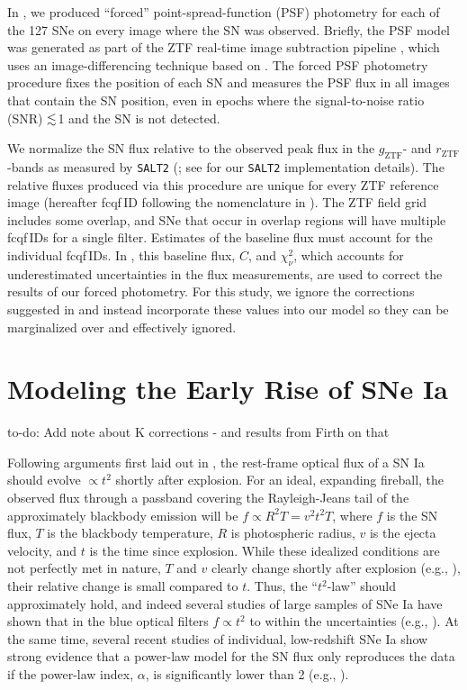 \documentclass[twocolumn]{./aastex63}
\newcommand{\todo}[1]{{\color{magenta} to-do: {#1}}}
\newcommand{\rztf}{$r_\mathrm{ZTF}$}
\newcommand{\gztf}{$g_\mathrm{ZTF}$}
\begin{document}
In \citet{Yao19}, we produced ``forced'' point-spread-function (PSF) photometry
for each of the 127 SNe on every image where the SN was observed. Briefly, the
PSF model was generated as part of the ZTF real-time image subtraction pipeline
\citep{Masci19}, which uses an image-differencing technique based on
\citet{Zackay16}. The forced PSF photometry procedure fixes the position of each
SN and measures the PSF flux in all images that contain the SN position, even in
epochs where the signal-to-noise ratio (SNR) $\lesssim$1 and the SN is not detected.

We normalize the SN flux relative to the observed peak flux in the \gztf- and
\rztf-bands as measured by \texttt{SALT2} (\citealt{Guy07}; see \citealt{Yao19}
for our \texttt{SALT2} implementation details). The relative fluxes produced via
this procedure are unique for every ZTF reference image (hereafter fcqf\,ID
following the nomenclature in \citealt{Yao19}). The ZTF field grid includes some
overlap, and SNe that occur in overlap regions will have multiple fcqf\,IDs for
a single filter. Estimates of the baseline flux must account for the individual
fcqf\,IDs. In \citet{Yao19}, this baseline flux, $C$, and $\chi^2_{\nu}$, which
accounts for underestimated uncertainties in the flux measurements, are used to
correct the results of our forced photometry. For this study, we ignore the
corrections suggested in \citet{Yao19} and instead incorporate these values into
our model so they can be marginalized over and effectively ignored.

\section{Modeling the Early Rise of SNe Ia}\label{sec:model}

\todo{Add note about K corrections - and results from Firth on that}

Following arguments first laid out in \citet{Riess99a}, the rest-frame optical
flux of a SN Ia should evolve $\propto t^2$ shortly after explosion. For an
ideal, expanding fireball, the observed flux through a passband covering the
Rayleigh-Jeans tail of the approximately blackbody emission will be $f \propto
R^2 T = v^2 t^2 T$, where $f$ is the SN flux, $T$ is the blackbody temperature,
$R$ is photospheric radius, $v$ is the ejecta velocity, and $t$ is the time
since explosion. While these idealized conditions are not perfectly met in
nature, $T$ and $v$ clearly change shortly after explosion (e.g.,
\citealt{Parrent12}), their relative change is small compared to $t$. Thus, the
``$t^2$-law'' should approximately hold, and indeed several studies of large
samples of SNe Ia have shown that in the blue optical filters $f \propto t^2$ to
within the uncertainties (e.g., \citealt{Conley06, Hayden10, Ganeshalingam11}).
At the same time, several recent studies of individual, low-redshift SNe Ia show
strong evidence that a power-law model for the SN flux only reproduces the data
if the power-law index, $\alpha$, is significantly lower than 2 (e.g.,
\citealt{Zheng13,Zheng14,Shappee16,Miller18,Fausnaugh19,Dimitriadis19}).
\end{document}
